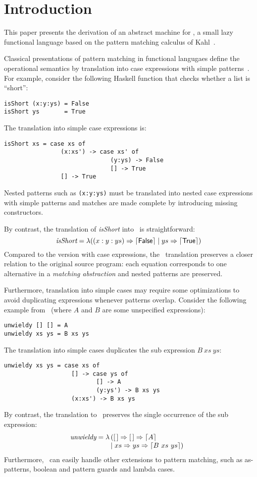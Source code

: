 \section{Introduction}

This paper presents the derivation of an abstract machine for \lambdaPMC, a small
lazy functional language based on the pattern matching calculus
of Kahl~\cite{kahl_2004}.

Classical presentations of pattern matching in functional langugaes
define the operational semantics by translation
into case expressions with simple patterns~\cite{spj_1987,jones_1992}. For
example, consider the following Haskell function that checks whether a
list is ``short'':
\begin{verbatim}
isShort (x:y:ys) = False
isShort ys       = True
\end{verbatim}
The translation into simple case expressions is:
\begin{verbatim}
isShort xs = case xs of
                (x:xs') -> case xs' of
                              (y:ys) -> False
                              [] -> True
                [] -> True
\end{verbatim}
Nested patterns such as \verb|(x:y:ys)| must be translated into nested
case expressions with simple patterns and matches are made complete by
introducing missing constructors.  

By contrast, the translation of \textit{isShort} into \lambdaPMC\ is
straightforward:
\[ 
  \textit{isShort} = \lambda ((x:y:ys) \Rightarrow \left\lceil \textsf{False}\right\rceil \mid
  ys \Rightarrow \left\lceil \textsf{True}\right\rceil) 
\]
Compared to the version with case expressions, the \lambdaPMC\ translation
preserves a closer relation to the original source program: each
equation corresponds to one alternative in a \emph{matching
  abstraction} and nested patterns are preserved. 

Furthermore, translation into simple cases may require some
optimizations to avoid duplicating expressions whenever patterns
overlap. Consider the following example from~\cite{spj_1987} (where
$A$ and $B$ are some unspecified expressions):
\begin{verbatim}
unwieldy [] [] = A
unwieldy xs ys = B xs ys
\end{verbatim}
The translation into simple cases duplicates the sub expression $B~ xs~ ys$:
\begin{verbatim}
unwieldy xs ys = case xs of
                   [] -> case ys of
                          [] -> A
                          (y:ys') -> B xs ys
                   (x:xs') -> B xs ys
\end{verbatim}
By contrast, the translation to \lambdaPMC\ preserves the single occurrence of
the sub expression:
\[
  \textit{unwieldy} =
  \lambda\!\! \begin{array}[t]{l}
             ([\,] \Rightarrow [\,] \Rightarrow \left\lceil A\right\rceil \\
             \mid xs \Rightarrow ys \Rightarrow \left\lceil B~xs~ys\right\rceil)
             \end{array}
\]
Furthermore, \lambdaPMC\ can easily handle
other extensions to pattern matching, such as as-patterns, boolean and
pattern guards and lambda cases.

